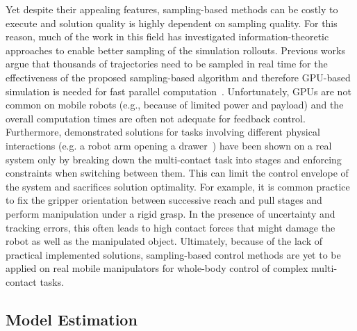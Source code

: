 Yet despite their appealing features, sampling-based methods can be costly to execute and solution quality is highly dependent on sampling quality. For this reason, much of the work in this field has investigated information-theoretic approaches to enable better sampling of the simulation rollouts. Previous works argue that thousands of trajectories need to be sampled in real time for the effectiveness of the proposed sampling-based algorithm and therefore GPU-based simulation is needed for fast parallel computation~\cite{williams_model_2017}. 
Unfortunately, GPUs are not common on mobile robots (e.g., because of limited power and payload) and the overall computation times are often not adequate for feedback control. 
Furthermore, demonstrated solutions for tasks involving different physical interactions (e.g. a robot arm opening a drawer~\cite{abraham_model-based_2020}) have been shown on a real system only by breaking down the multi-contact task into stages and enforcing constraints when switching between them. 
This can limit the control envelope of the system and sacrifices solution optimality. For example, it is common practice to fix the gripper orientation between successive reach and pull stages and perform manipulation under a rigid grasp. In the presence of uncertainty and tracking errors, this often leads to high contact forces that might damage the robot as well as the manipulated object.
Ultimately, because of the lack of practical implemented solutions, sampling-based control methods are yet to be applied on real mobile manipulators for whole-body control of complex multi-contact tasks.

\subsection{Model Estimation}

